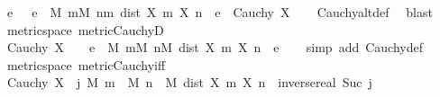 \begin{isabellebody}
\ \ {\isachardoublequoteopen}{\isacharparenleft}{\kern0pt}{\isasymAnd}e{\isachardot}{\kern0pt}\ {}\ {\isacharless}{\kern0pt}\ e\ {\isasymLongrightarrow}\ {\isasymexists}M{\isachardot}{\kern0pt}\ {\isasymforall}m{\isasymge}M{\isachardot}{\kern0pt}\ {\isasymforall}n{\isachargreater}{\kern0pt}m{\isachardot}{\kern0pt}\ dist\ {\isacharparenleft}{\kern0pt}X\ m{\isacharparenright}{\kern0pt}\ {\isacharparenleft}{\kern0pt}X\ n{\isacharparenright}{\kern0pt}\ {\isacharless}{\kern0pt}\ e{\isacharparenright}{\kern0pt}\ {\isasymLongrightarrow}\ Cauchy\ X{\isachardoublequoteclose}\isanewline
%
\isadelimproof
\ \ %
\endisadelimproof
%
\isatagproof
{}\isamarkupfalse%
\ Cauchy{\isacharunderscore}{\kern0pt}altdef\ \isamarkupfalse%
\ blast%
\endisatagproof
{\isafoldproof}%
%
\isadelimproof
\isanewline
%
\endisadelimproof
\isanewline
{}\isamarkupfalse%
\ {\isacharparenleft}{\kern0pt}\ metric{\isacharunderscore}{\kern0pt}space{\isacharparenright}{\kern0pt}\ metric{\isacharunderscore}{\kern0pt}CauchyD{\isacharcolon}{\kern0pt}\isanewline
\ \ {\isachardoublequoteopen}Cauchy\ X\ {\isasymLongrightarrow}\ {}\ {\isacharless}{\kern0pt}\ e\ {\isasymLongrightarrow}\ {\isasymexists}M{\isachardot}{\kern0pt}\ {\isasymforall}m{\isasymge}M{\isachardot}{\kern0pt}\ {\isasymforall}n{\isasymge}M{\isachardot}{\kern0pt}\ dist\ {\isacharparenleft}{\kern0pt}X\ m{\isacharparenright}{\kern0pt}\ {\isacharparenleft}{\kern0pt}X\ n{\isacharparenright}{\kern0pt}\ {\isacharless}{\kern0pt}\ e{\isachardoublequoteclose}\isanewline
%
\isadelimproof
\ \ %
\endisadelimproof
%
\isatagproof
{}\isamarkupfalse%
\ {\isacharparenleft}{\kern0pt}simp\ add{\isacharcolon}{\kern0pt}\ Cauchy{\isacharunderscore}{\kern0pt}def{\isacharparenright}{\kern0pt}%
\endisatagproof
{\isafoldproof}%
%
\isadelimproof
\isanewline
%
\endisadelimproof
\isanewline
{}\isamarkupfalse%
\ {\isacharparenleft}{\kern0pt}\ metric{\isacharunderscore}{\kern0pt}space{\isacharparenright}{\kern0pt}\ metric{\isacharunderscore}{\kern0pt}Cauchy{\isacharunderscore}{\kern0pt}iff{}{\isacharcolon}{\kern0pt}\isanewline
\ \ {\isachardoublequoteopen}Cauchy\ X\ {\isacharequal}{\kern0pt}\ {\isacharparenleft}{\kern0pt}{\isasymforall}j{\isachardot}{\kern0pt}\ {\isacharparenleft}{\kern0pt}{\isasymexists}M{\isachardot}{\kern0pt}\ {\isasymforall}m\ {\isasymge}\ M{\isachardot}{\kern0pt}\ {\isasymforall}n\ {\isasymge}\ M{\isachardot}{\kern0pt}\ dist\ {\isacharparenleft}{\kern0pt}X\ m{\isacharparenright}{\kern0pt}\ {\isacharparenleft}{\kern0pt}X\ n{\isacharparenright}{\kern0pt}\ {\isacharless}{\kern0pt}\ inverse{\isacharparenleft}{\kern0pt}real\ {\isacharparenleft}{\kern0pt}Suc\ j{\isacharparenright}{\kern0pt}{\isacharparenright}{\kern0pt}{\isacharparenright}{\kern0pt}{\isacharparenright}{\kern0pt}{\isachardoublequoteclose}\isanewline

\end{isabellebody}
